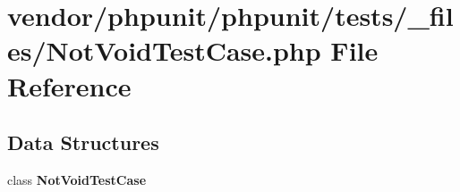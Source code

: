 \section{vendor/phpunit/phpunit/tests/\+\_\+files/\+Not\+Void\+Test\+Case.php File Reference}
\label{_not_void_test_case_8php}
\subsection*{Data Structures}
\begin{DoxyCompactItemize}
\item 
class {\bf Not\+Void\+Test\+Case}
\end{DoxyCompactItemize}
